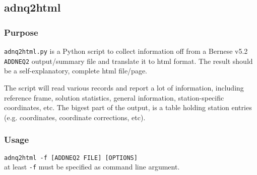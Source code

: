 \subsection{adnq2html}
\label{adnq2html}

\subsubsection{Purpose}
\texttt{adnq2html.py} is a Python script to collect information off from a Bernese v5.2
\texttt{ADDNEQ2} output/summary file and translate it to html format. The result
should be a self-explanatory, complete html file/page.

The script will read various records and report a lot of information, including
reference frame, solution statistics, general information, station-specific coordinates,
etc. The bigest part of the output, is a table holding station entries (e.g. coordinates,
coordinate corrections, etc).

\subsubsection{Usage}
\texttt{adnq2html -f [ADDNEQ2 FILE] [OPTIONS]}\\
at least \texttt{-f} must be specified as command line argument.\\

